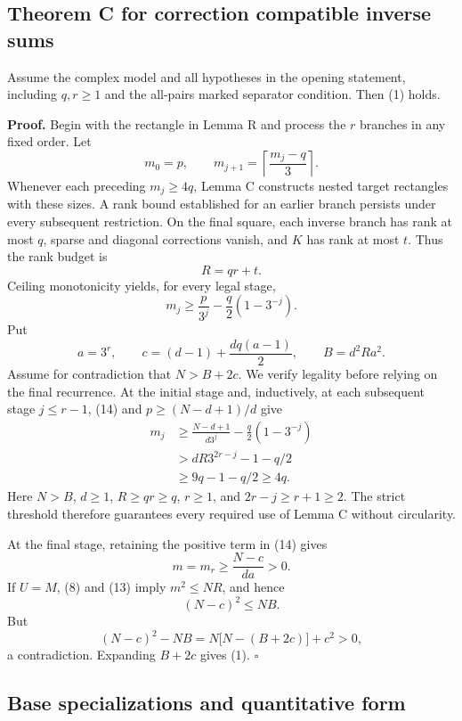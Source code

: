\documentclass[
  11pt,
]{article}
\begin{document}
\subsection{Theorem C for correction compatible inverse
sums}\label{theorem-c-for-correction-compatible-inverse-sums}

Assume the complex model and all hypotheses in the opening statement,
including \(q,r\ge1\) and the all-pairs marked separator condition. Then
(1) holds.

\textbf{Proof.} Begin with the rectangle in Lemma R and process the
\(r\) branches in any fixed order. Let \[
 m_0=p,\qquad m_{j+1}=\left\lceil\frac{m_j-q}{3}\right\rceil.\tag{12}
\] Whenever each preceding \(m_j\ge4q\), Lemma C constructs nested
target rectangles with these sizes. A rank bound established for an
earlier branch persists under every subsequent restriction. On the final
square, each inverse branch has rank at most \(q\), sparse and diagonal
corrections vanish, and \(K\) has rank at most \(t\). Thus the rank
budget is \[
 R=qr+t.                                                   \tag{13}
\] Ceiling monotonicity yields, for every legal stage, \[
 m_j\ge\frac p{3^j}-\frac q2(1-3^{-j}).                     \tag{14}
\] Put \[
 a=3^r,\qquad c=(d-1)+\frac{dq(a-1)}2,\qquad B=d^2Ra^2.
\] Assume for contradiction that \(N>B+2c\). We verify legality before
relying on the final recurrence. At the initial stage and, inductively,
at each subsequent stage \(j\le r-1\), (14) and \(p\ge(N-d+1)/d\) give
\[
 \begin{split}
 m_j&\ge\frac{N-d+1}{d3^j}-\frac q2(1-3^{-j})\\
    &>dR3^{2r-j}-1-q/2\\
    &\ge9q-1-q/2\ge4q.
 \end{split}                                               \tag{15}
\] Here \(N>B\), \(d\ge1\), \(R\ge qr\ge q\), \(r\ge1\), and
\(2r-j\ge r+1\ge2\). The strict threshold therefore guarantees every
required use of Lemma C without circularity.

At the final stage, retaining the positive term in (14) gives \[
 m=m_r\ge\frac{N-c}{da}>0.                                 \tag{16}
\] If \(U=M\), (8) and (13) imply \(m^2\le NR\), and hence \[
 (N-c)^2\le NB.
\] But \[
 (N-c)^2-NB=N\bigl[N-(B+2c)\bigr]+c^2>0,
\] a contradiction. Expanding \(B+2c\) gives (1). \(\square\)

\subsection{Base specializations and quantitative
form}\label{base-specializations-and-quantitative-form}
\end{document}
